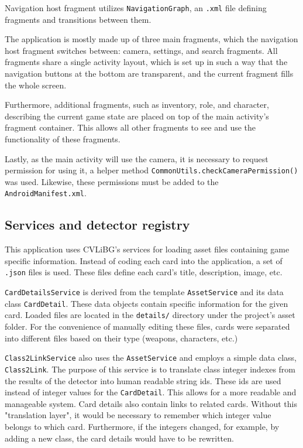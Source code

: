 Navigation host fragment utilizes \texttt{NavigationGraph}, an \texttt{.xml} file defining fragments and transitions between them. 

The application is mostly made up of three main fragments, which the navigation host fragment switches between: camera, settings, and search fragments. All fragments share a single activity layout, which is set up in such a way that the navigation buttons at the bottom are transparent, and the current fragment fills the whole screen.

Furthermore, additional fragments, such as inventory, role, and character, describing the current game state are placed on top of the main activity's fragment container. This allows all other fragments to see and use the functionality of these fragments.

Lastly, as the main activity will use the camera, it is necessary to request permission for using it, a helper method \texttt{CommonUtils.checkCameraPermission()} was used. Likewise, these permissions must be added to the \texttt{AndroidManifest.xml}.

\subsection{Services and detector registry}
This application uses CVLiBG's services for loading asset files containing game specific information. Instead of coding each card into the application, a set of \texttt{.json} files is used. These files define each card's title, description, image, etc.

\texttt{CardDetailsService} is derived from the template \texttt{AssetService} and its data class \texttt{CardDetail}. These data objects contain specific information for the given card. Loaded files are located in the \texttt{details/} directory under the project's asset folder. For the convenience of manually editing these files, cards were separated into different files based on their type (weapons, characters, etc.)

\texttt{Class2LinkService} also uses the \texttt{AssetService} and employs a simple data class, \texttt{Class2Link}. The purpose of this service is to translate class integer indexes from the results of the detector into human readable string ids. These ids are used instead of integer values for the \texttt{CardDetail}. This allows for a more readable and manageable system. Card details also contain links to related cards. Without this "translation layer", it would be necessary to remember which integer value belongs to which card. Furthermore, if the integers changed, for example, by adding a new class, the card details would have to be rewritten. 

